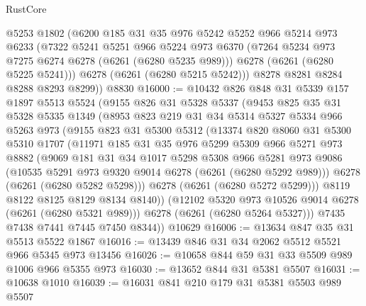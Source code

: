 \begin{lexlean}{RustCore}
\begin{coremodule}
        @5253
        @1802
        (@6200
          @185
          @31
          @35
          @976
          @5242
          @5252
          @966
          @5214
          @973
          @6233
          (@7322
            @5241
            @5251
            @966
            @5224
            @973
            @6370
            (@7264 @5234 @973 @7275 @6274 @6278 (@6261 (@6280 @5235 @989)))
            @6278
            (@6261 (@6280 @5225 @5241)))
          @6278
          (@6261 (@6280 @5215 @5242)))
        @8278
        @8281
        @8284
        @8288
        @8293
        @8299))
    @8830
@16000 := @10432
    @826
    @848
    @31
    @5339
    @157
    @1897
    @5513
    @5524
    (@9155
      @826
      @31
      @5328
      @5337
      (@9453
        @825
        @35
        @31
        @5328
        @5335
        @1349
        (@8953
          @823
          @219
          @31
          @34
          @5314
          @5327
          @5334
          @966
          @5263
          @973
          (@9155
            @823
            @31
            @5300
            @5312
            (@13374
              @820
              @8060
              @31
              @5300
              @5310
              @1707
              (@11971
                @185
                @31
                @35
                @976
                @5299
                @5309
                @966
                @5271
                @973
                @8882
                (@9069
                  @181
                  @31
                  @34
                  @1017
                  @5298
                  @5308
                  @966
                  @5281
                  @973
                  @9086
                  (@10535 @5291 @973 @9320 @9014 @6278 (@6261 (@6280 @5292 @989)))
                  @6278
                  (@6261 (@6280 @5282 @5298)))
                @6278
                (@6261 (@6280 @5272 @5299)))
              @8119
              @8122
              @8125
              @8129
              @8134
              @8140))
          (@12102 @5320 @973 @10526 @9014 @6278 (@6261 (@6280 @5321 @989)))
          @6278
          (@6261 (@6280 @5264 @5327)))
        @7435
        @7438
        @7441
        @7445
        @7450
        @8344))
    @10629
@16006 := @13634 @847 @35 @31 @5513 @5522 @1867
@16016 := @13439 @846 @31 @34 @2062 @5512 @5521 @966 @5345 @973 @13456
@16026 := @10658 @844 @59 @31 @33 @5509 @989 @1006 @966 @5355 @973
@16030 := @13652 @844 @31 @5381 @5507
@16031 := @10638 @1010
@16039 := @16031 @841 @210 @179 @31 @5381 @5503 @989 @5507

\end{coremodule}
\end{lexlean}
